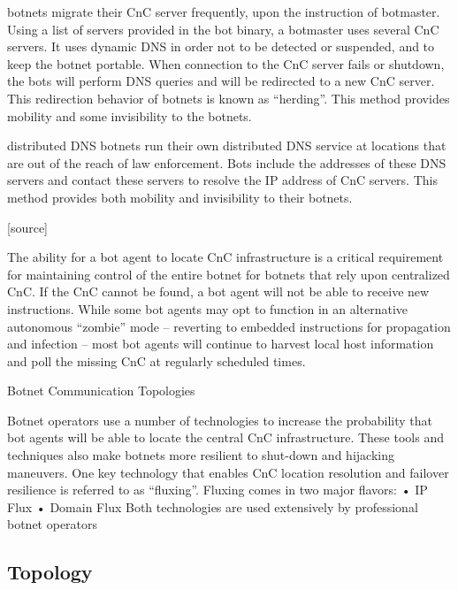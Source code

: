 botnets migrate their CnC server frequently, upon the instruction of botmaster. Using a list of servers provided in the bot binary, a botmaster uses several CnC servers. It uses dynamic DNS in order not to be detected or suspended, and to keep the botnet portable. When connection to the CnC server fails or shutdown, the bots will perform DNS queries and will be redirected to a new CnC server. This redirection behavior of botnets is known as “herding”. This method provides mobility and some invisibility to the botnets. 

distributed DNS 
botnets run their own distributed DNS service at locations that are out of the reach of law enforcement. Bots include the addresses of these DNS servers and contact these servers to resolve the IP address of CnC servers. This method provides both mobility and invisibility to their botnets.

[source]

The ability for a bot agent to locate CnC infrastructure is a critical requirement for maintaining control of the entire botnet for botnets that rely upon centralized CnC. If the CnC cannot be found, a bot agent will not be able to receive new instructions. While some bot agents may opt to function in an alternative autonomous “zombie” mode – reverting to embedded instructions for propagation and infection – most bot agents will continue to harvest local host information and poll the missing CnC at regularly scheduled times. 

Botnet Communication Topologies

Botnet operators use a number of technologies to increase the probability that bot agents will be able to locate the central CnC infrastructure. These tools and techniques also make botnets more resilient to shut-down and hijacking maneuvers.
One key technology that enables CnC location resolution and failover resilience is
referred to as “fluxing”. Fluxing comes in two major flavors:
• IP Flux
• Domain Flux
Both technologies are used extensively by professional botnet operators




\subsection{Topology}
